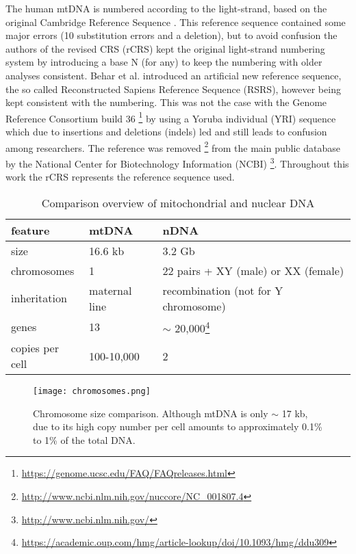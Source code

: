 The human mtDNA is numbered according to the light-strand, based on the original Cambridge Reference Sequence \cite{Anderson1981}. This reference sequence contained some major errors (10 substitution errors and a deletion), but to avoid confusion the authors of the revised CRS (rCRS) \cite{Andrews1999} kept the original light-strand numbering system by introducing a base N (for any) to keep the numbering with older analyses consistent. Behar et al. \cite{Behar2012} introduced an artificial new reference sequence, the so called Reconstructed Sapiens Reference Sequence (RSRS), however being kept consistent with the numbering. This was not the case with the Genome Reference Consortium build 36 \footnote{\url{https://genome.ucsc.edu/FAQ/FAQreleases.html}} by using a Yoruba individual (YRI) sequence which due to insertions and deletions (indels) led and still leads to confusion among researchers. The reference was removed \footnote{\url{http://www.ncbi.nlm.nih.gov/nuccore/NC_001807.4}} from the main public database by the National Center for Biotechnology Information (NCBI) \footnote{\url{http://www.ncbi.nlm.nih.gov/}}. Throughout this work the rCRS represents the reference sequence used. 
\begin{table}[ht]
  \begin{tabular}{lll}
     \toprule
    feature  & mtDNA & nDNA \\ 
		\midrule
    size & 16.6 kb & 3.2 Gb  \\ 
		chromosomes & 1 & 22 pairs + XY (male) or XX (female)\\ 
    inheritation & maternal line & recombination (not for Y chromosome) \\ 

		genes & 13 & $\sim$ 20,000\footnote{\url{https://academic.oup.com/hmg/article-lookup/doi/10.1093/hmg/ddu309}} \\ 
		copies per cell & 100-10,000 & 2 \\ 
		\bottomrule
    \end{tabular}
    \caption[Comparison overview mtDNA and nDNA]{Comparison overview of mitochondrial and nuclear DNA }
    \label{tab:features}
\end{table}

\begin{figure}[ht]
\begin{center}
\texttt{[image: chromosomes.png]}
\caption[Chromosome size comparison]{Chromosome size comparison. Although mtDNA is only $\sim$ 17 kb, due to its high copy number per cell amounts to approximately 0.1\% to 1\% of the total DNA.}
\label{fig:figureChromosomes}
\end{center}

\end{figure}

